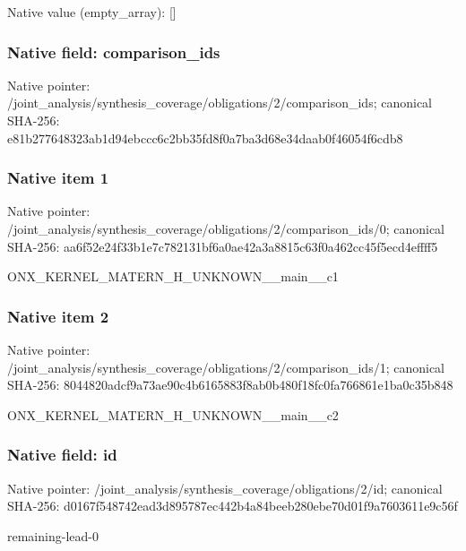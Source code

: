 \documentclass[10pt,a4paper]{article}
\begin{document}
Native value (empty\_\allowbreak{}array): []

\subsubsection{Native field: comparison\_\allowbreak{}ids}
Native pointer: /joint\_\allowbreak{}analysis/synthesis\_\allowbreak{}coverage/obligations/2/comparison\_\allowbreak{}ids; canonical SHA-256: e81b277648323ab1d94ebccc6c2bb35fd8f0a7ba3d68e34daab0f46054f6cdb8

\subsubsection{Native item 1}
Native pointer: /joint\_\allowbreak{}analysis/synthesis\_\allowbreak{}coverage/obligations/2/comparison\_\allowbreak{}ids/0; canonical SHA-256: aa6f52e24f33b1e7c782131bf6a0ae42a3a8815c63f0a462cc45f5ecd4effff5

\begingroup\raggedright\sloppy ONX\_\allowbreak{}KERNEL\_\allowbreak{}MATERN\_\allowbreak{}H\_\allowbreak{}UNKNOWN\_\allowbreak{}\_\allowbreak{}main\_\allowbreak{}\_\allowbreak{}c1\par\endgroup

\subsubsection{Native item 2}
Native pointer: /joint\_\allowbreak{}analysis/synthesis\_\allowbreak{}coverage/obligations/2/comparison\_\allowbreak{}ids/1; canonical SHA-256: 8044820adcf9a73ae90c4b6165883f8ab0b480f18fc0fa766861e1ba0c35b848

\begingroup\raggedright\sloppy ONX\_\allowbreak{}KERNEL\_\allowbreak{}MATERN\_\allowbreak{}H\_\allowbreak{}UNKNOWN\_\allowbreak{}\_\allowbreak{}main\_\allowbreak{}\_\allowbreak{}c2\par\endgroup

\subsubsection{Native field: id}
Native pointer: /joint\_\allowbreak{}analysis/synthesis\_\allowbreak{}coverage/obligations/2/id; canonical SHA-256: d0167f548742ead3d895787ec442b4a84beeb280ebe70d01f9a7603611e9c56f

\begingroup\raggedright\sloppy remaining-lead-0\par\endgroup
\end{document}

